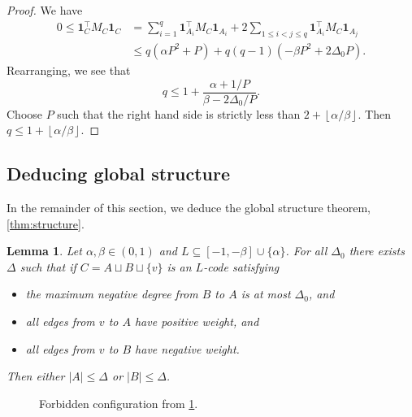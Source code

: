 \documentclass[reqno, 11pt]{amsart}
\newtheorem{lemma}[theorem]{Lemma}
\theoremstyle{definition}
\theoremstyle{remark}
\newcommand{\floor}[1]{\left\lfloor #1 \right\rfloor}
\begin{document}
\begin{proof}
	We have
	\begin{align*}
		0 \leq \mathbf{1}_C^\intercal M_C \mathbf{1}_C &= \sum_{i = 1}^q\mathbf{1}_{A_i}^\intercal M_C \mathbf{1}_{A_i} + 2\sum_{1\leq i < j \leq q}\mathbf{1}_{A_i}^\intercal M_C \mathbf{1}_{A_j} \\
        &\leq  q\left(\alpha P^2 + P\right) + q(q-1)\left(-\beta P^2 + 2 \Delta_0 P\right).
    \end{align*}
Rearranging, we see that
\[
	q \leq 1 + \frac{\alpha + 1/P}{\beta - 2\Delta_0/P}.
	\]
Choose $P$ such that the right hand side is strictly less than $2 + \floor{\alpha/\beta}$. Then $q \leq 1 + \floor{\alpha/\beta}$.
\end{proof}

\subsection{Deducing global structure}
In the remainder of this section, we deduce the global structure theorem, \cref{thm:structure}.


\begin{lemma}\label{lem:strong-positive-clique}
Let $\alpha, \beta \in (0,1)$ and $L \subseteq [-1,-\beta]\cup\{\alpha\}$.
For all $\Delta_0$ there exists $\Delta$ such that if $C = A \sqcup B \sqcup \{v\}$ is an $L$-code satisfying 
\begin{itemize}
    \item[(a)] the maximum negative degree from $B$ to $A$ is at most $\Delta_0$, and
    \item[(b)] all edges from $v$ to $A$ have positive weight, and
    \item[(c)] all edges from $v$ to $B$ have negative weight.
\end{itemize}
Then either $|A| \leq \Delta$ or $|B| \leq \Delta$.
\end{lemma}

\begin{figure}[h]
\caption{Forbidden configuration from \cref{lem:strong-positive-clique}.}
\end{figure}
\end{document}
